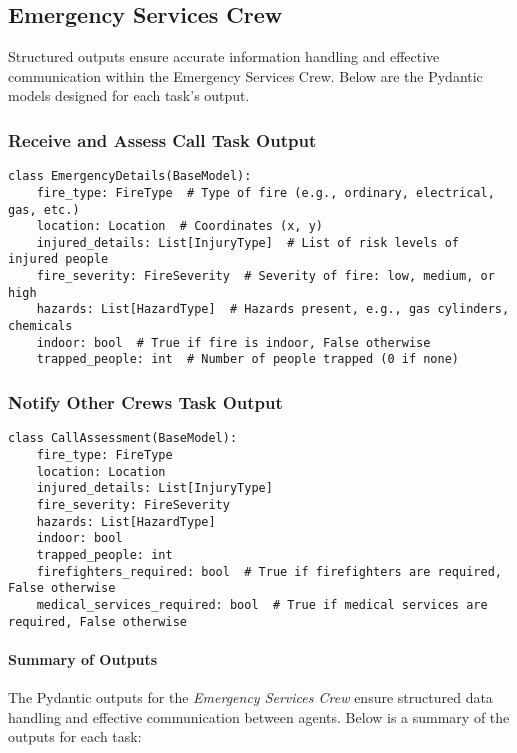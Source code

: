 \subsection{Emergency Services Crew}

Structured outputs ensure accurate information handling and effective communication within the Emergency Services Crew. Below 
are the Pydantic models designed for each task's output.

\subsubsection{Receive and Assess Call Task Output}

\begin{lstlisting}[caption={Pydantic model for Receive and Assess Call Task Output}] 
class EmergencyDetails(BaseModel):
    fire_type: FireType  # Type of fire (e.g., ordinary, electrical, gas, etc.)
    location: Location  # Coordinates (x, y)
    injured_details: List[InjuryType]  # List of risk levels of injured people
    fire_severity: FireSeverity  # Severity of fire: low, medium, or high
    hazards: List[HazardType]  # Hazards present, e.g., gas cylinders, chemicals
    indoor: bool  # True if fire is indoor, False otherwise
    trapped_people: int  # Number of people trapped (0 if none)
\end{lstlisting}

\subsubsection{Notify Other Crews Task Output}

\begin{lstlisting}[caption={Pydantic model for Notify Other Crews Task Output}] 
class CallAssessment(BaseModel):
    fire_type: FireType
    location: Location
    injured_details: List[InjuryType]
    fire_severity: FireSeverity
    hazards: List[HazardType]
    indoor: bool
    trapped_people: int
    firefighters_required: bool  # True if firefighters are required, False otherwise
    medical_services_required: bool  # True if medical services are required, False otherwise
\end{lstlisting}

\paragraph{Summary of Outputs}
The Pydantic outputs for the \textit{Emergency Services Crew} ensure structured data handling and effective communication between agents. Below is a summary of the outputs for each task:

